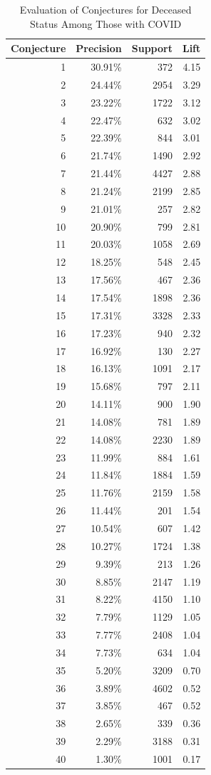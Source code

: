 \documentclass[ijds,nonblindrev]{informs-ijds}
\begin{document}
\begin{APPENDICES}
 \begin{table}[!ht]
 \caption{\label{deceasedstats}Evaluation of Conjectures for Deceased Status Among Those with COVID}
 \centering
 \begin{tabular}{rrrr}
Conjecture & Precision & Support & Lift\\
\hline
1 & 30.91\% & 372 & 4.15\\
2 & 24.44\% & 2954 & 3.29\\
3 & 23.22\% & 1722 & 3.12\\
4 & 22.47\% & 632 & 3.02\\
5 & 22.39\% & 844 & 3.01\\
6 & 21.74\% & 1490 & 2.92\\
7 & 21.44\% & 4427 & 2.88\\
8 & 21.24\% & 2199 & 2.85\\
9 & 21.01\% & 257 & 2.82\\
10 & 20.90\% & 799 & 2.81\\
11 & 20.03\% & 1058 & 2.69\\
12 & 18.25\% & 548 & 2.45\\
13 & 17.56\% & 467 & 2.36\\
14 & 17.54\% & 1898 & 2.36\\
15 & 17.31\% & 3328 & 2.33\\
16 & 17.23\% & 940 & 2.32\\
17 & 16.92\% & 130 & 2.27\\
18 & 16.13\% & 1091 & 2.17\\
19 & 15.68\% & 797 & 2.11\\
20 & 14.11\% & 900 & 1.90\\
21 & 14.08\% & 781 & 1.89\\
22 & 14.08\% & 2230 & 1.89\\
23 & 11.99\% & 884 & 1.61\\
24 & 11.84\% & 1884 & 1.59\\
25 & 11.76\% & 2159 & 1.58\\
26 & 11.44\% & 201 & 1.54\\
27 & 10.54\% & 607 & 1.42\\
28 & 10.27\% & 1724 & 1.38\\
29 & 9.39\% & 213 & 1.26\\
30 & 8.85\% & 2147 & 1.19\\
31 & 8.22\% & 4150 & 1.10\\
32 & 7.79\% & 1129 & 1.05\\
33 & 7.77\% & 2408 & 1.04\\
34 & 7.73\% & 634 & 1.04\\
35 & 5.20\% & 3209 & 0.70\\
36 & 3.89\% & 4602 & 0.52\\
37 & 3.85\% & 467 & 0.52\\
38 & 2.65\% & 339 & 0.36\\
39 & 2.29\% & 3188 & 0.31\\
40 & 1.30\% & 1001 & 0.17 \\ \hline
\end{tabular}
\end{table}

 \end{APPENDICES}
\end{document}
